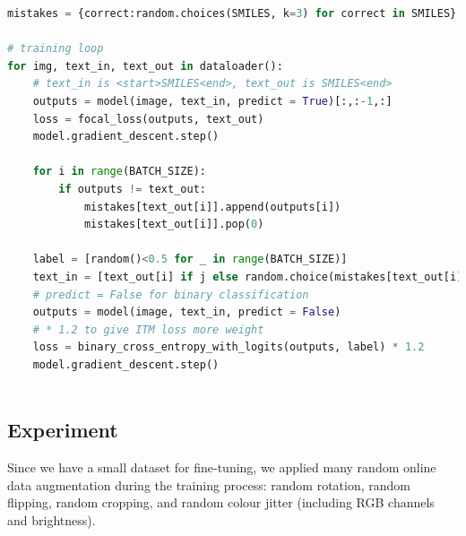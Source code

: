 \documentclass[12pt]{article}
\begin{document}
\begin{minipage}{\linewidth}
\tiny

    \begin{lstlisting}[language=Python, caption=Training Process Pseudocode, label=selfnagative]
mistakes = {correct:random.choices(SMILES, k=3) for correct in SMILES}

# training loop
for img, text_in, text_out in dataloader():
    # text_in is <start>SMILES<end>, text_out is SMILES<end>
    outputs = model(image, text_in, predict = True)[:,:-1,:]
    loss = focal_loss(outputs, text_out)
    model.gradient_descent.step()

    for i in range(BATCH_SIZE):
        if outputs != text_out:
            mistakes[text_out[i]].append(outputs[i])
            mistakes[text_out[i]].pop(0)
    
    label = [random()<0.5 for _ in range(BATCH_SIZE)]
    text_in = [text_out[i] if j else random.choice(mistakes[text_out[i]]) for i, j in enumerate(label)]
    # predict = False for binary classification 
    outputs = model(image, text_in, predict = False)
    # * 1.2 to give ITM loss more weight
    loss = binary_cross_entropy_with_logits(outputs, label) * 1.2 
    model.gradient_descent.step()
    
\end{lstlisting}
\end{minipage}
\subsection{Experiment}

Since we have a small dataset for fine-tuning, we applied many random online data augmentation during the training process: random rotation, random flipping, random cropping,  and random colour jitter (including RGB channels and brightness). 
\end{document}

